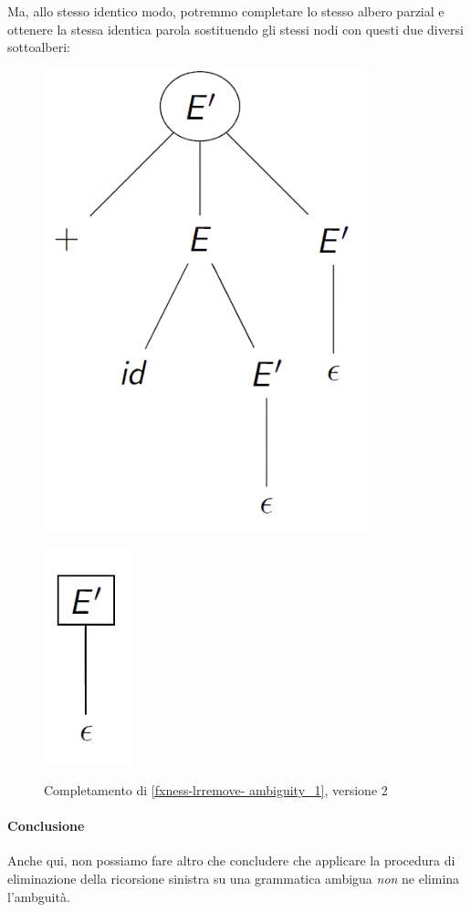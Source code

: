 \documentclass[class=book, crop=false, oneside, 12pt]{standalone}
\begin{document}
Ma, allo stesso identico modo, potremmo completare lo stesso albero parzial e ottenere la stessa identica parola sostituendo gli stessi nodi con questi due diversi sottoalberi:
\begin{figure}[H]
    \begin{minipage}[b]{0.4\textwidth}
        \centering
        \includegraphics[width=.35\textwidth,keepaspectratio]{fxness-lrremove-ambiguity_3_1.png}
        \subcaption{}
        \label{fxness-lrremove- ambiguity_3_1}
    \end{minipage}
    \hfill
    \begin{minipage}[b]{0.4\textwidth}
        \centering
        \includegraphics[width=.15\textwidth,keepaspectratio]{fxness-lrremove-ambiguity_3_2.png}
        \subcaption{}
        \label{fxness-lrremove- ambiguity_3_2}
    \end{minipage}
    \caption{Completamento di \ref{fxness-lrremove- ambiguity_1}, versione 2}
    \label{fxness-lrremove- ambiguity_3}
\end{figure}

\paragraph{Conclusione}
Anche qui, non possiamo fare altro che concludere che applicare la procedura di eliminazione della ricorsione sinistra su una grammatica ambigua \emph{non} ne elimina l'ambguità.
\end{document}
